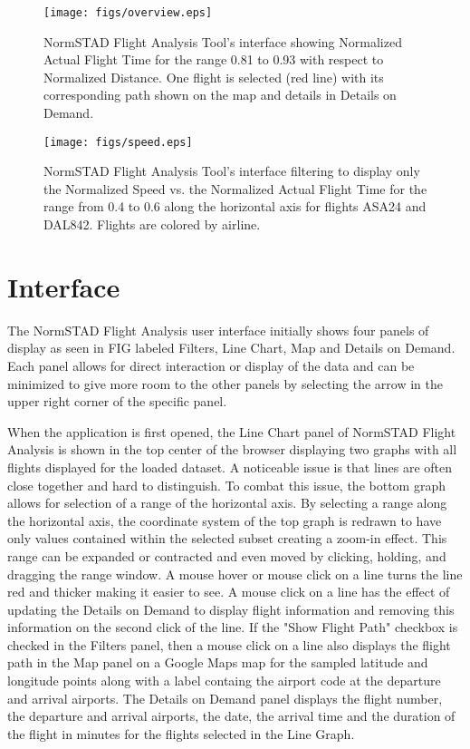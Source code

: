 \documentclass{sig-alternate}
\begin{document}
\begin{figure*}
\centering
\texttt{[image: figs/overview.eps]}
\caption{
NormSTAD Flight Analysis Tool's interface showing Normalized Actual Flight Time
for the range 0.81 to 0.93 with 
respect to Normalized Distance. One flight is selected (red line) with its 
corresponding path shown on the map and details in Details on Demand.
}
\label{overview}
\end{figure*}

\begin{figure*}
\centering
\texttt{[image: figs/speed.eps]}
\caption{
	NormSTAD Flight Analysis Tool's interface filtering to display only 
the Normalized Speed vs. the Normalized Actual Flight Time for the range from 0.4
to 0.6 along the horizontal axis for flights ASA24 and DAL842. Flights are colored by
airline.
}
\label{speed}
\end{figure*}

\section{Interface}
\label{sec-interface}

The NormSTAD Flight Analysis user interface initially shows four panels of display as seen in 
FIG labeled Filters, Line Chart, Map and Details on Demand. Each panel allows for 
direct interaction or display of the data and can be minimized to
give more room to the other panels by selecting 
the arrow in the upper right corner of the specific panel. 

When the application is first opened, the Line Chart panel of NormSTAD Flight Analysis is shown in the top
center of the browser displaying two graphs with all flights displayed for the 
loaded dataset. A noticeable issue is that lines are often close together and hard to
distinguish.
 To combat this issue, the bottom graph allows for selection of a range of 
the horizontal axis. By selecting a range along the horizontal axis, the coordinate
system of the top graph is redrawn to have only values contained within the selected subset
creating a zoom-in effect. This range can be expanded or contracted and even moved by clicking,
holding, and dragging the range window. A mouse hover or mouse click on a
line turns the line red and 
thicker making it easier to see. A mouse click on a line has the effect of
updating the Details on Demand
to display flight information and removing this information on the second click of the line. 
If the "Show Flight Path" checkbox is checked in the Filters panel, then a mouse click on a line also displays
the flight path in the Map panel on a Google Maps map for the sampled latitude and longitude points along with a label containg the airport code at the departure and arrival airports.
The Details on Demand panel displays the flight number, the departure and arrival airports, the date,
the arrival time and the duration of the flight in minutes for the flights selected in the
Line Graph.
\end{document}
